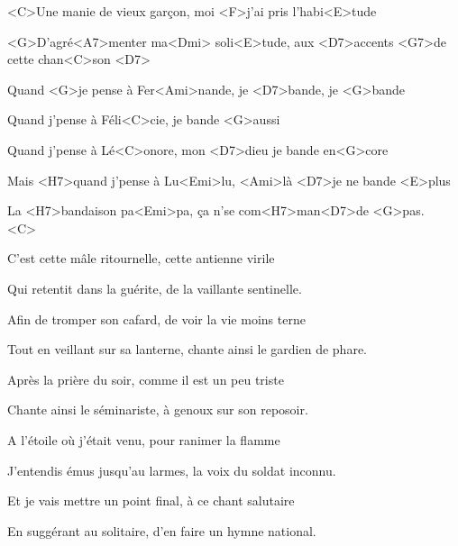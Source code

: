 

\zs
<C>Une manie de vieux garçon,
moi <F>j'ai pris l'habi<E>tude

<G>D'agré<A7>menter ma<Dmi> soli<E>tude,
aux <D7>accents <G7>de cette chan<C>son <D7>
\ks

\zr 
Quand <G>je pense à Fer<Ami>nande,
je <D7>bande, je <G>bande

Quand j'pense à Féli<C>cie,
je bande <G>aussi

Quand j'pense à Lé<C>onore,
mon <D7>dieu je bande en<G>core

Mais <H7>quand j'pense à Lu<Emi>lu,
<Ami>là <D7>je ne bande <E>plus

La <H7>bandaison pa<Emi>pa,
ça n'se com<H7>man<D7>de <G>pas. ~~~ <C>
\kr

\zs
C'est cette mâle ritournelle,
cette antienne virile 

Qui retentit dans la guérite,
de la vaillante sentinelle.
\ks

\zr \kr

\zs
Afin de tromper son cafard,
de voir la vie moins terne 

Tout en veillant sur sa lanterne,
chante ainsi le gardien de phare.
\ks

\zr \kr

\zs
Après la prière du soir,
comme il est un peu triste 

Chante ainsi le séminariste,
à genoux sur son reposoir.
\ks

\zr \kr

\zs
A l'étoile où j'était venu,
pour ranimer la flamme 

J'entendis émus jusqu'au larmes,
la voix du soldat inconnu.
\ks

\zr \kr

\zs
Et je vais mettre un point final,
à ce chant salutaire 

En suggérant au solitaire,
d'en faire un hymne national.
\ks

\zr \kr

\kp
